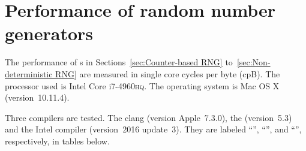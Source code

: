 %
%
%
%

\chapter{Performance of random number generators}
\label{chap:Performance of random number generators}

The performance of \rng{}s in Sections~\ref{sec:Counter-based RNG}
to~\ref{sec:Non-deterministic RNG} are measured in single core cycles per byte
(cpB). The processor used is Intel Core i7-4960\textsc{hq}. The operating
system is Mac OS X (version~10.11.4).

Three compilers are tested. The \llvm clang (version Apple~7.3.0), the \gnu{}
\gcc (version~5.3) and the Intel \cpp compiler (version~2016 update~3). They
are labeled ``\llvm'', ``\gcc'', and ``\icc'', respectively, in tables below.

